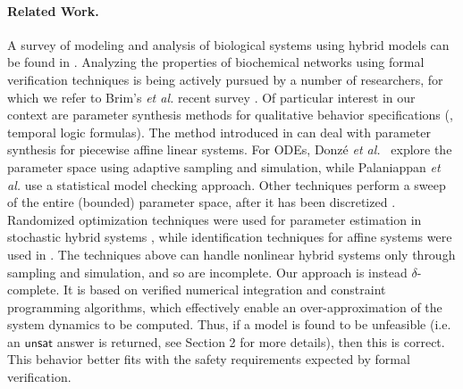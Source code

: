 \paragraph{Related Work.}
A survey of modeling and analysis of biological systems using hybrid models can be found in \cite{luca08}. Analyzing the properties of biochemical networks using formal verification techniques is being actively pursued by a number of researchers, for which we refer to Brim's {\em et al.} recent survey \cite{BrimSFM13}. Of particular interest in our context are parameter synthesis methods for qualitative behavior specifications (\eg, temporal logic formulas). The method introduced in \cite{rovergene} can deal with parameter synthesis for piecewise affine linear systems. For ODEs, Donz\'{e} {\em et al.}~\cite{donze} explore the parameter space using adaptive sampling and simulation, while Palaniappan {\em et al.} \cite{liu13} use a statistical model checking approach. Other techniques perform a sweep of the entire (bounded) parameter space, after it has been discretized \cite{Calzone06,Donaldson08}. Randomized optimization techniques were used for parameter estimation in stochastic hybrid systems \cite{Koutroumpas08}, while identification techniques for affine systems were used in \cite{Cinquemani08}. The techniques above can handle nonlinear hybrid systems only through sampling and 
simulation, and so are incomplete. Our approach is instead $\delta$-complete. It is based on verified numerical integration and constraint programming algorithms, which effectively enable an over-approximation of the system dynamics to be computed. Thus, if a model is found to be unfeasible (i.e. an $\mathsf{unsat}$ answer is returned, see Section 2 for more details), then this is correct. This behavior better fits with the safety requirements expected by formal verification.


